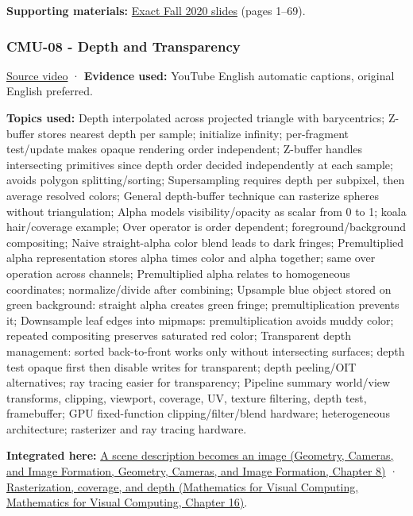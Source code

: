 \textbf{Supporting materials:} \href{https://15462.courses.cs.cmu.edu/fall2020content/lectures/07_texture/07_texture_slides.pdf}{Exact Fall 2020 slides} (pages 1--69).

\subsubsection{CMU-08 - Depth and Transparency}\label{04-visual-computing-ii-ch036-cmu-08---depth-and-transparency}

\href{https://www.youtube.com/watch?v=WtYfF48Z9mA}{Source video} · \textbf{Evidence used:} YouTube English automatic captions, original English preferred.

\textbf{Topics used:} Depth interpolated across projected triangle with barycentrics; Z-buffer stores nearest depth per sample; initialize infinity; per-fragment test/update makes opaque rendering order independent; Z-buffer handles intersecting primitives since depth order decided independently at each sample; avoids polygon splitting/sorting; Supersampling requires depth per subpixel, then average resolved colors; General depth-buffer technique can rasterize spheres without triangulation; Alpha models visibility/opacity as scalar from 0 to 1; koala hair/coverage example; Over operator is order dependent; foreground/background compositing; Naive straight-alpha color blend leads to dark fringes; Premultiplied alpha representation stores alpha times color and alpha together; same over operation across channels; Premultiplied alpha relates to homogeneous coordinates; normalize/divide after combining; Upsample blue object stored on green background: straight alpha creates green fringe; premultiplication prevents it; Downsample leaf edges into mipmaps: premultiplication avoids muddy color; repeated compositing preserves saturated red color; Transparent depth management: sorted back-to-front works only without intersecting surfaces; depth test opaque first then disable writes for transparent; depth peeling/OIT alternatives; ray tracing easier for transparency; Pipeline summary world/view transforms, clipping, viewport, coverage, UV, texture filtering, depth test, framebuffer; GPU fixed-function clipping/filter/blend hardware; heterogeneous architecture; rasterizer and ray tracing hardware.

\textbf{Integrated here:} \href{../03-Geometry-Cameras-and-Image-Formation/main.pdf\#nameddest=03-visual-computing-i-ch001-a-scene-description-becomes-an-image}{A scene description becomes an image (Geometry, Cameras, and Image Formation, Geometry, Cameras, and Image Formation, Chapter 8)} · \href{../02-Mathematics-for-Visual-Computing/main.pdf\#nameddest=03-visual-computing-i-ch012-rasterization-coverage-and-depth}{Rasterization, coverage, and depth (Mathematics for Visual Computing, Mathematics for Visual Computing, Chapter 16)}.

